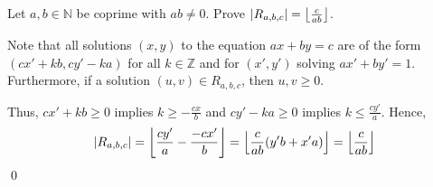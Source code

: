 \documentclass{article}
\newcommand{\N}{\mathbb{N}}
\newcommand{\Z}{\mathbb{Z}}
\DeclarePairedDelimiter\floor{\lfloor}{\rfloor}
\begin{document}
\subsection{} %
  Let $a,b\in\N$ be coprime with $ab\ne0$. Prove $|R_{a,b,c}|=\floor*{
  \frac{c}{ab}}$.

  Note that all solutions $(x,y)$ to the equation $ax+by=c$ are of the form
  $(cx'+kb,cy'-ka)$ for all $k\in\Z$ and for $(x',y')$ solving $ax'+by'=1$.
  Furthermore, if a solution $(u,v)\in R_{a,b,c}$, then $u,v\geq0$.

  Thus, $cx'+kb\geq0$ implies $k\geq-\frac{cx}{b}$ and $cy'-ka\geq0$ implies $k
  \leq\frac{cy'}{a}$. Hence,
  \begin{align*}
    |R_{a,b,c}| = \floor*{\frac{cy'}{a}-\frac{-cx'}{b}}
                = \floor*{\frac{c}{ab}(y'b+x'a)}
                = \floor*{\frac{c}{ab}}
  \end{align*}
  \qed

\subsection{} %
\end{document}
